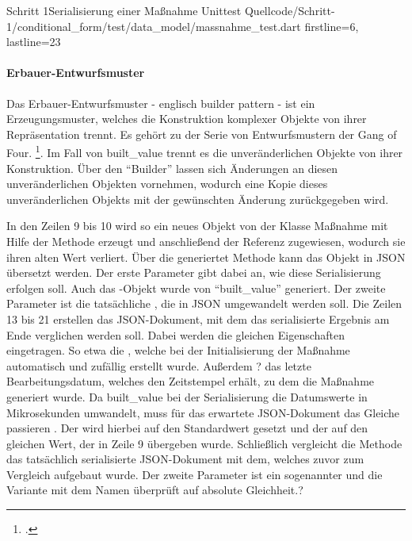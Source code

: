 \begin{alexlisting}{Schritt 1}{Serialisierung einer Maßnahme Unittest}
  {Quellcode/Schritt-1/conditional_form/test/data_model/massnahme_test.dart}
  {firstline=6, lastline=23}
  \label{lst:SerialisierungEinerMassnahmeUnittest}
\end{alexlisting}

\paragraph{Erbauer-Entwurfsmuster} Das Erbauer-Entwurfsmuster - englisch builder pattern - ist ein Erzeugungsmuster, welches die Konstruktion komplexer Objekte von ihrer Repräsentation trennt.
Es gehört zu der Serie von Entwurfsmustern der Gang of Four. \footcite[Vgl.][S. 119]{gamma2009entwurfsmuster}. Im Fall von built_value trennt es die unveränderlichen Objekte von ihrer Konstruktion. Über den \enquote{Builder} lassen sich Änderungen an diesen unveränderlichen Objekten vornehmen, wodurch eine Kopie dieses unveränderlichen Objekts mit der gewünschten Änderung zurückgegeben wird.

In den Zeilen 9 bis 10 wird so ein neues Objekt von der Klasse Maßnahme mit Hilfe der Methode  erzeugt und anschließend der Referenz  zugewiesen, wodurch sie ihren alten Wert verliert.
Über die generiertet Methode   kann das Objekt in JSON übersetzt werden.
Der erste Parameter  gibt dabei an, wie diese Serialisierung erfolgen soll. Auch das -Objekt wurde von \enquote{built_value} generiert.
Der zweite Parameter ist die tatsächliche , die in JSON umgewandelt werden soll.
Die Zeilen 13 bis 21 erstellen das JSON-Dokument, mit dem das serialisierte Ergebnis am Ende verglichen werden soll. Dabei werden die gleichen Eigenschaften eingetragen.
So etwa die , welche bei der Initialisierung der Maßnahme automatisch und zufällig erstellt wurde. Außerdem ? das letzte Bearbeitungsdatum, welches den Zeitstempel erhält, zu dem die Maßnahme generiert wurde.
Da built_value bei der Serialisierung die Datumswerte in Mikrosekunden umwandelt, muss für das erwartete JSON-Dokument das Gleiche passieren .
Der   wird hierbei auf den Standardwert  gesetzt und der   auf den gleichen Wert, der in Zeile 9 übergeben wurde.
Schließlich vergleicht die Methode  das tatsächlich serialisierte JSON-Dokument mit dem, welches zuvor zum Vergleich aufgebaut wurde.
Der zweite Parameter ist ein sogenannter  und die Variante mit dem Namen  überprüft auf absolute Gleichheit.?



